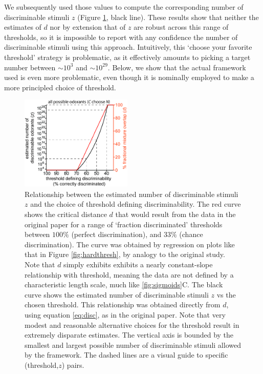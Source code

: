\documentclass[letterpaper,twocolumn,10pt]{article}
\begin{document}
We subsequently used those values to compute the corresponding number of discriminable stimuli $z$ (Figure \ref{fig:z_d_threshold}, black line).  
These results show that neither the estimates of $d$ nor by extension that of $z$ are robust across this range of thresholds, 
so it is impossible to report with any confidence the number of discriminable stimuli using this approach. 
Intuitively, this `choose your favorite threshold' strategy is problematic, 
as it effectively amounts to picking a target number between $\sim 10^{3}$ and $\sim 10^{29}$. 
Below, we show that the actual framework used is even more problematic, 
even though it is nominally employed to make a more principled choice of threshold. 


\begin{figure}[!hbt]
    \centering
    \includegraphics[width=0.475\textwidth]{figures/Fig7_Z_D_vs_threshold}
    \caption{
Relationship between the estimated number of discriminable stimuli $z$ and the choice of threshold defining discriminability. 
The red curve shows the critical distance $d$ that would result from the data in the original paper \cite{bushdid_humans_2014} 
for a range of `fraction discriminated' thresholds between $100\%$ (perfect discrimination), 
and $33\%$ (chance discrimination). 
The curve was obtained by regression on plots like that in Figure \ref{fig:hardthresh}, by analogy to the original study. 
Note that $d$ simply exhibits exhibits a nearly constant-slope relationship with threshold, 
meaning the data are not defined by a characteristic length scale, much like \ref{fig:sigmoids}C.
The black curve shows the estimated number of discriminable stimuli $z$ vs the chosen threshold. 
This relationship was obtained directly from $d$, using equation \ref{eq:disc}, as in the original paper. 
Note that very modest and reasonable alternative choices for the threshold result in extremely disparate estimates. The vertical axis is bounded by the smallest and largest possible number of discriminable stimuli allowed by the framework.  
The dashed lines are a visual guide to specific (threshold,$z$) pairs.}
    \label{fig:z_d_threshold}
\end{figure}
\end{document}

